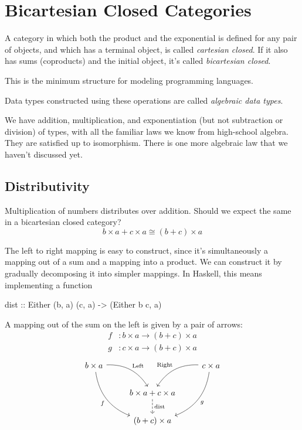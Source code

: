 \documentclass[DaoFP]{subfiles}
\begin{document}
\section{Bicartesian Closed Categories}

A category in which both the product and the exponential is defined for any pair of objects, and which has a terminal object, is called \emph{cartesian closed}. If it also has sums (coproducts) and the initial object, it's called \emph{bicartesian closed}. 

This is the minimum structure for modeling programming languages. 

Data types constructed using these operations are called \emph{algebraic data types}.

We have addition, multiplication, and exponentiation (but not subtraction or division) of types, with all the familiar laws we know from high-school algebra. They are satisfied up to isomorphism. There is one more algebraic law that we haven't discussed yet.

\subsection{Distributivity}

Multiplication of numbers distributes over addition. Should we expect the same in a bicartesian closed category?
\[b \times a + c \times a \cong (b + c) \times a\]

The left to right mapping is easy to construct, since it's simultaneously a mapping out of a sum and a mapping into a product. We can construct it by gradually decomposing it into simpler mappings. In Haskell, this means implementing a function
\begin{haskell}
dist :: Either (b, a) (c, a) -> (Either b c, a)
\end{haskell}
A mapping out of the sum on the left is given by a pair of arrows:
\begin{align*}
f &\colon b\times a \to (b + c) \times a \\
g &\colon c\times a \to (b + c) \times a 
\end{align*}
\[
 \begin{tikzcd}
 b \times a
 \arrow[dr,  bend left, "\text{Left}"]
 \arrow[ddr, bend right, "f"']
 && c \times a
 \arrow[dl, bend right, "\text{Right}"']
 \arrow[ddl, bend left, "g"]
 \\
& b \times a + c \times a
\arrow[d, dashed, "\text{dist}"]
\\
& (b + c) \times a
 \end{tikzcd}
\]
\end{document}
